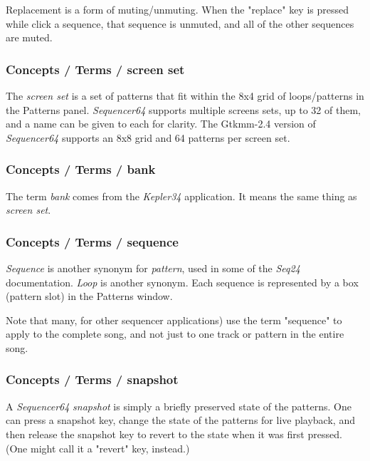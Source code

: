    Replacement is a form of muting/unmuting.  When the "replace" key is
   pressed while click a sequence, that sequence is unmuted, and all of the
   other sequences are muted.

\subsubsection{Concepts / Terms / screen set}
\label{subsubsec:concepts_terms_screen_set}

   The \textsl{screen set}
   is a set of patterns that fit within the 8x4 grid of loops/patterns in the
   Patterns panel.
   \textsl{Sequencer64} supports multiple screens sets, up to 32 of them,
   and a name can be given to each for clarity.
   The Gtkmm-2.4 version of \textsl{Sequencer64}
   supports an 8x8 grid and 64 patterns per screen set.

\subsubsection{Concepts / Terms / bank}
\label{subsubsec:concepts_terms_bank}

   The term \textsl{bank} comes from the \textsl{Kepler34} application.
   It means the same thing as \textsl{screen set}.

\subsubsection{Concepts / Terms / sequence}
\label{subsubsec:concepts_terms_sequence}

   \textsl{Sequence} is
   another synonym for \textsl{pattern}, used in some of the \textsl{Seq24}
   documentation.  \textsl{Loop} is another synonym.
   Each sequence is represented by a box (pattern slot) in the Patterns window.

   Note that many, for other sequencer applications) use the term "sequence"
   to apply to the complete song, and not just to one track or pattern in the
   entire song.

\subsubsection{Concepts / Terms / snapshot}
\label{subsubsec:concepts_terms_snapshot}

   A \textsl{Sequencer64} \textsl{snapshot} is simply a briefly preserved
   state of the patterns.  One can press a snapshot key, change the state of
   the patterns for live playback, and then release the snapshot key to
   revert to the state when it was first pressed.  (One might call it a
   "revert" key, instead.)

